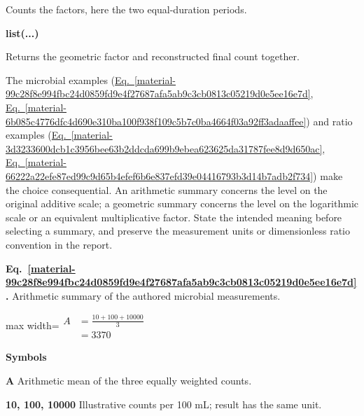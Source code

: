 \documentclass[11pt,a4paper]{article}
\begin{document}
Counts the factors, here the two equal-duration periods.

\par\noindent\textbf{list(...)}

Returns the geometric factor and reconstructed final count together.

\medskip

The microbial examples (\hyperref[material-99c28f8e994fbc24d0859fd9e4f27687afa5ab9c3cb0813c05219d0e5ee16e7d]{Eq.~\ref*{material-99c28f8e994fbc24d0859fd9e4f27687afa5ab9c3cb0813c05219d0e5ee16e7d}}, \hyperref[material-6b085c4776dfc4d690e310ba100f938f109c5b7c0ba4664f03a92ff3adaaffee]{Eq.~\ref*{material-6b085c4776dfc4d690e310ba100f938f109c5b7c0ba4664f03a92ff3adaaffee}}) and ratio examples (\hyperref[material-3d3233600dcb1c3956bee63b2ddcda699b9ebea623625da31787fee8d9d650ac]{Eq.~\ref*{material-3d3233600dcb1c3956bee63b2ddcda699b9ebea623625da31787fee8d9d650ac}}, \hyperref[material-66222a22efe87ed99c9d65b4efef6b6e837efd39e04416793b3d14b7adb2f734]{Eq.~\ref*{material-66222a22efe87ed99c9d65b4efef6b6e837efd39e04416793b3d14b7adb2f734}}) make the choice consequential. An arithmetic summary concerns the level on the original additive scale; a geometric summary concerns the level on the logarithmic scale or an equivalent multiplicative factor. State the intended meaning before selecting a summary, and preserve the measurement units or dimensionless ratio convention in the report.


\par\medskip
\begin{samepage}
\label{material-99c28f8e994fbc24d0859fd9e4f27687afa5ab9c3cb0813c05219d0e5ee16e7d}
\noindent\textbf{Eq.~\ref*{material-99c28f8e994fbc24d0859fd9e4f27687afa5ab9c3cb0813c05219d0e5ee16e7d}.} Arithmetic summary of the authored microbial measurements.\par\nopagebreak
\begin{center}\begin{adjustbox}{max width=\linewidth}$\displaystyle \begin{aligned}A&=\frac{10+100+10000}{3}\\&=3370\end{aligned}$\end{adjustbox}\end{center}

\par\noindent\textbf{Symbols}

\par\noindent\textbf{A} Arithmetic mean of the three equally weighted counts.

\par\noindent\textbf{10, 100, 10000} Illustrative counts per 100 mL; result has the same unit.

\end{samepage}
\medskip
\end{document}
